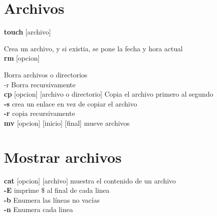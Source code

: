 \documentclass[11pt]{article}
\begin{document}
\section{Archivos}
\textbf{touch} [archivo] 

\hspace{2cm} Crea un archivo, y si existia, se pone la fecha y hora actual
\\

\textbf{rm} [opcion] 

\hspace{2cm} Borra archivos o directorios\\

\hspace{2cm} -r 
\hspace{2cm}Borra recursivamente\\

\textbf{cp} [opcion] [archivo o directorio] \hspace{2cm} Copia el archivo primero al segundo\\

\hspace{2cm}\textbf{-s} crea un enlace en vez de copiar el archivo\\

\hspace{2cm} \textbf{-r} copia recursivamente\\

\textbf{mv} [opcion] [inicio] [final] \hspace{2cm} mueve archivos \\

\section{Mostrar archivos}

\textbf{cat} [opcion] [archivo] \hspace{2cm} muestra el contenido de un archivo\\

\hspace{2cm} \textbf{-E} \hspace{2cm} imprime \$ al final de cada linea\\

\hspace{2cm} \textbf{-b} \hspace{2cm} Enumera las líneas no vacías\\

\hspace{2cm} \textbf{-n} \hspace{2cm} Enumera cada linea\\
\end{document}
